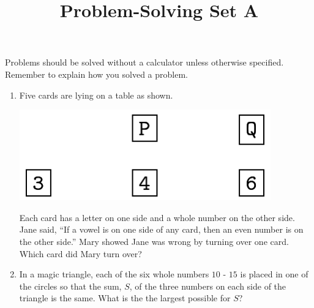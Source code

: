 \documentclass{article}
\title{Problem-Solving Set A}
\author{}
\date{}
\begin{document}
\maketitle
\noindent Problems should be solved without a calculator unless otherwise specified.
Remember to explain how you solved a problem.
\begin{multicols*}{2}
    \begin{enumerate}
        \item Five cards are lying on a table as shown.
            \begin{center}
                \includegraphics[scale=0.25]{5-2_cards.png}
            \end{center}
            Each card has a letter on one side and a whole number on the other side.
            Jane said, ``If a vowel is on one side of any card, then an even number is on the other side.''
            Mary showed Jane was wrong by turning over one card.
            Which card did Mary turn over?
            \vspace{3cm}
        \item In a magic triangle, each of the six whole numbers $10$ - $15$ is placed in one of the circles so that the sum, $S$, of the three numbers on each side of the triangle is the same.
            What is the the largest possible for $S$?
            \begin{center}
\end{center}
\end{enumerate}
\end{multicols*}
\end{document}
